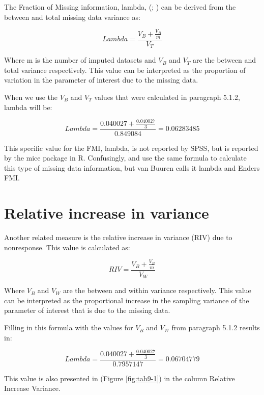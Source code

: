 \documentclass[
]{book}
\begin{document}
The Fraction of Missing information, lambda, (\citet{VanBuuren2018}; \citet{raghunathan2016}) can be derived from the between and total missing data variance as:

\begin{equation}
Lambda = \frac{V_B + \frac{V_B}{m}}{V_T}
  \label{eq:lambda}
\end{equation}

Where m is the number of imputed datasets and \({V_B}\) and \({V_T}\) are the between and total variance respectively. This value can be interpreted as the proportion of variation in the parameter of interest due to the missing data.

When we use the \({V_B}\) and \({V_T}\) values that were calculated in paragraph 5.1.2, lambda will be:

\[Lambda = \frac{0.040027 + \frac{0.040027}{3}}{0.849084}=0.06283485\]

This specific value for the FMI, lambda, is not reported by SPSS, but is reported by the mice package in R. Confusingly, \citet{VanBuuren2018} and \citet{enders2010applied} use the same formula to calculate this type of missing data information, but van Buuren calls it lambda and Enders FMI.

\hypertarget{relative-increase-in-variance}{%
\section{Relative increase in variance}\label{relative-increase-in-variance}}

Another related measure is the relative increase in variance (RIV) due to nonresponse. This value is calculated as:

\begin{equation}
RIV = \frac{V_B + \frac{V_B}{m}}{V_W}
  \label{eq:riv}
\end{equation}

Where \({V_B}\) and \({V_W}\) are the between and within variance respectively. This value can be interpreted as the proportional increase in the sampling variance of the parameter of interest that is due to the missing data.

Filling in this formula with the values for \({V_B}\) and \({V_W}\) from paragraph 5.1.2 results in:

\[Lambda = \frac{0.040027 + \frac{0.040027}{3}}{0.7957147}=0.06704779\]

This value is also presented in (Figure \ref{fig:tab9-1}) in the column Relative Increase Variance.
\end{document}
